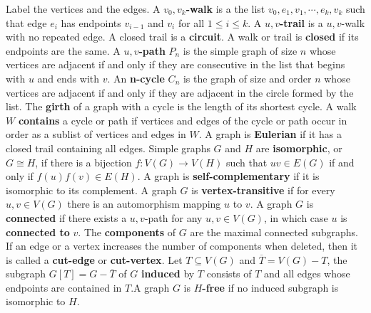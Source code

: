 \documentclass[11pt]{article}
\theoremstyle{definition}
\theoremstyle{dotles}
\theoremstyle{dotless}
\theoremstyle{remark}
\begin{document}
Label the vertices and the edges. A \textbf{$v_0,v_k$-walk} is a the list $v_0,e_1,v_1,\cdots,e_k,v_k$ such that edge $e_i$ has endpoints $v_{i-1}$ and $v_i$ for all $1\leq i\leq k$. A \textbf{$u,v$-trail} is a $u,v$-walk with no repeated edge. A closed trail is a \textbf{circuit}. A walk or trail is \textbf{closed} if its endpoints are the same. A \textbf{$u,v$-path} $P_n$ is the simple graph of size $n$ whose vertices are adjacent if and only if they are consecutive in the list that begins with $u$ and ends with $v$. An \textbf{n-cycle} $C_n$ is the graph of size and order $n$ whose vertices are adjacent if and only if they are adjacent in the circle formed by the list. The \textbf{girth} of a graph with a cycle is the length of its shortest cycle. A walk $W$ \textbf{contains} a cycle or path if vertices and edges of the cycle or path occur in order as a sublist of vertices and edges in $W$. A graph is \textbf{Eulerian} if it has a closed trail containing all edges.\medbreak
Simple graphs $G$ and $H$ are \textbf{isomorphic}, or $G\cong H$, if there is a bijection $f:V(G)\to V(H)$ such that $uv\in E(G)$ if and only if $f(u)f(v)\in E(H)$. A graph is \textbf{self-complementary} if it is isomorphic to its complement. A graph $G$ is \textbf{vertex-transitive} if for every $u,v\in V(G)$ there is an automorphism mapping $u$ to $v$.\medbreak
A graph $G$ is \textbf{connected} if there exists a $u,v$-path for any $u,v\in V(G)$, in which case $u$ is \textbf{connected to} $v$. The \textbf{components} of $G$ are the maximal connected subgraphs. If an edge or a vertex increases the number of components when deleted, then it is called a \textbf{cut-edge} or \textbf{cut-vertex}. Let $T\subseteq V(G)$ and $\overline{T}=V(G)-T$, the subgraph $G[T]=G-\overline{T}$ of $G$ \textbf{induced} by $T$ consists of $T$ and all edges whose endpoints are contained in $T$.A graph $G$ is \textbf{$H$-free} if no induced subgraph is isomorphic to $H$.
\end{document}
